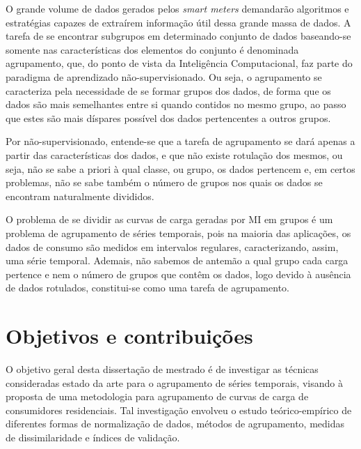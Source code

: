 O grande volume de dados gerados pelos \emph{smart meters} demandarão algoritmos e estratégias capazes de extraírem informação útil dessa grande massa de dados. A tarefa de se encontrar subgrupos em determinado conjunto de dados baseando-se somente nas características dos elementos do conjunto é denominada agrupamento, que, do ponto de vista da Inteligência Computacional, faz parte do paradigma de aprendizado não-supervisionado. Ou seja, o agrupamento se caracteriza pela necessidade de se formar grupos dos dados, de forma que os dados são mais semelhantes entre si quando contidos no mesmo grupo, ao passo que estes são mais díspares possível dos dados pertencentes a outros grupos. 

Por não-supervisionado, entende-se que a tarefa de agrupamento se dará apenas a partir das características dos dados, e que não existe rotulação dos mesmos, ou seja, não se sabe a priori à qual classe, ou grupo, os dados pertencem e, em certos problemas, não se sabe também o número de grupos nos quais os dados se encontram naturalmente divididos.

O problema de se dividir as curvas de carga geradas por MI em grupos é um problema de agrupamento de séries temporais, pois na maioria das aplicações, os dados de consumo são medidos em intervalos regulares, caracterizando, assim, uma série temporal. Ademais, não sabemos de antemão a qual grupo cada carga pertence e nem o número de grupos que contêm os dados, logo devido à ausência de dados rotulados, constitui-se como uma tarefa de agrupamento.

\section{Objetivos e contribuições}

O objetivo geral desta dissertação de mestrado é de investigar as técnicas consideradas estado da arte para o agrupamento de séries temporais, visando à proposta de uma metodologia para agrupamento de curvas de carga de consumidores residenciais. Tal investigação envolveu o estudo teórico-empírico de diferentes formas de normalização de dados, métodos de agrupamento, medidas de dissimilaridade e índices de validação.

